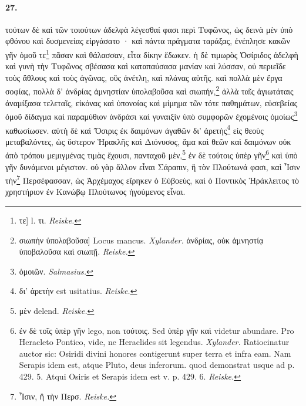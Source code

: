 \documentclass[a4paper, 11pt, oneside, polutonikogreek, german, landscape]{article}
\begin{document}
\paragraph{27.}
τούτων δὲ καὶ τῶν τοιούτων ἀδελφὰ λέγεσθαί φασι περὶ Τυφῶνος, ὡς δεινὰ μὲν ὑπὸ φθόνου καὶ δυσμενείας εἰργάσατο · καὶ πάντα πράγματα ταράξας, ἐνέπλησε κακῶν γῆν ὁμοῦ τε\footnote{τε] l. τι. \emph{Reiske.}} πᾶσαν καὶ θάλασσαν, εἶτα δίκην ἔδωκεν. ἡ δὲ τιμωρὸς Ὀσίριδος ἀδελφὴ καὶ γυνὴ τὴν Τυφῶνος σβέσασα καὶ καταπαύσασα μανίαν καὶ λύσσαν, οὐ περιεῖδε τοὺς ἄθλους καὶ τοὺς ἀγῶνας, οὓς ἀνέτλη, καὶ πλάνας αὑτῆς. καὶ πολλὰ μὲν ἔργα σοφίας, πολλὰ δ' ἀνδρίας ἀμνηστίαν ὑπολαβοῦσα καὶ σιωπήν,\footnote{σιωπὴν ὑπολαβοῦσα] Locus mancus. \emph{Xylander.} ἀνδρίας, οὐκ ἀμνηστίᾳ ὑποβαλοῦσα καὶ σιωπῇ. \emph{Reiske.}} ἀλλὰ ταῖς ἁγιωτάταις ἀναμίξασα τελεταῖς, εἰκόνας καὶ ὑπονοίας καὶ μίμημα τῶν τότε παθημάτων, εὐσεβείας ὁμοῦ δίδαγμα καὶ παραμύθιον ἀνδράσι καὶ γυναιξὶν ὑπὸ συμφορῶν ἐχομένοις ὁμοίως\footnote{ὁμοιῶν. \emph{Salmasius.}} καθωσίωσεν. αὐτὴ δὲ καὶ Ὄσιρις ἐκ δαιμόνων ἀγαθῶν δι' ἀρετὴς\footnote{δι' ἀρετὴν est usitatius. \emph{Reiske.}} εἰς θεοὺς μεταβαλόντες, ὡς ὕστερον Ἡρακλῆς καὶ Διόνυσος, ἅμα καὶ θεῶν καὶ δαιμόνων οὐκ ἀπὸ τρόπου μεμιγμένας τιμὰς ἔχουσι, πανταχοῦ μὲν,\footnote{μὲν delend. \emph{Reiske.}} ἐν δὲ τούτοις ὑπὲρ γῆν\footnote{ἐν δὲ τοῖς ὑπὲρ γῆν lego, non τούτοις. Sed ὑπὲρ γῆν καὶ videtur abundare. Pro Heracleto Pontico, vide, ne Heraclides sit legendus. \emph{Xylander.} Ratiocinatur auctor sic: Osiridi divini honores contigerunt super terra et infra eam. Nam Serapis idem est, atque Pluto, deus inferorum. quod demonstrat usque ad p. 429. 5. Atqui Osiris et Serapis idem est v. p. 429. 6. \emph{Reiske.}} καὶ ὑπὸ γῆν δυνάμενοι μέγιστον. οὐ γὰρ ἄλλον εἶναι Σάραπιν, ἢ τὸν Πλούτωνά φασι, καὶ Ἶσιν τὴν\footnote{Ἶσιν, ἢ τὴν Περσ. \emph{Reiske.}} Περσέφασσαν, ὡς Ἀρχέμαχος εἴρηκεν ὁ Εὐβοεὺς, καὶ ὁ Ποντικὸς Ἡράκλειτος τὸ χρηστήριον ἐν Κανώβῳ Πλούτωνος ἡγούμενος εἶναι.
\end{document}
